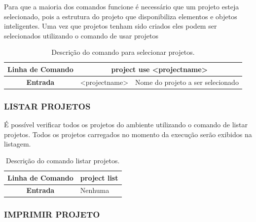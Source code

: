 \documentclass[a4paper,12pt]{monografia}
\theoremstyle{plain}
\theoremstyle{definition}
\theoremstyle{remark}
\begin{document}
Para que a maioria dos comandos funcione é necessário que um projeto esteja selecionado, pois a estrutura do projeto que disponibiliza elementos e objetos inteligentes. Uma vez que projetos tenham sido criados eles podem ser selecionados utilizando o comando de usar projetos

\begin{center}
\begin{table}[!htbp]
	\begin{tabular}{|c|c|m{}|}
		\hline
		\textbf{Linha de Comando} & \multicolumn{2}{c|}{project use <project\underline{\space\space}name>} \\
		\hline
		\textbf{Entrada} & <project\underline{\space\space}name> & Nome do projeto a ser selecionado \\
		\hline
	\end{tabular}
	\caption{Descrição do comando para selecionar projetos.}
	\label{tab:use_project}
\end{table}
\end{center}

\subsubsection{LISTAR PROJETOS}\label{sec:list_projects}

É possível verificar todos os projetos do ambiente utilizando o comando de listar projetos. Todos os projetos carregados no momento da execução serão exibidos na listagem.

\begin{center}
	\begin{table}[!htbp]
		\begin{tabular}{|c|m{}|}
			\hline
			\textbf{Linha de Comando} & \multicolumn{1}{c|}{project list} \\
			\hline
			\textbf{Entrada} & Nenhuma \\
			\hline
		\end{tabular}
		\caption{Descrição do comando listar projetos.}
		\label{tab:list_project}
	\end{table}
\end{center}

\subsubsection{IMPRIMIR PROJETO}\label{sec:print_projects}
\end{document}
